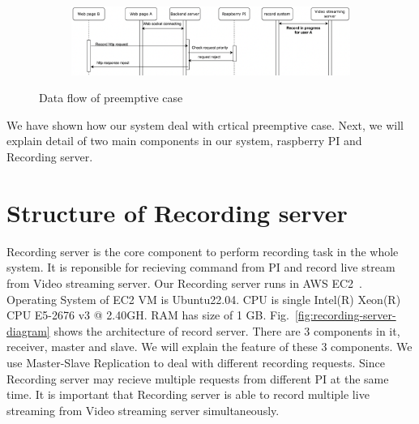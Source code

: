 \begin{figure}[H]
    \ContinuedFloat
    \centering
    \begin{subfigure}{\textwidth}
        \includegraphics[width=\textwidth]{figsrc/preemptive-B-lower.png}
        \label{fig:preemptive-B-lower}
    \end{subfigure}

    \caption{Data flow of preemptive case}
    \label{fig:preemptive-sequence}
\end{figure}

We have shown how our system deal with crtical preemptive case. Next, we will explain detail of two main components in our system, raspberry PI and Recording server. 

\section{Structure of Recording server}
Recording server is the core component to perform recording task in the whole system. It is reponsible for recieving command from PI and record live stream from Video streaming server. Our Recording server runs in AWS EC2~\cite{aws-ec2}. Operating System of EC2 VM is Ubuntu22.04. CPU is single Intel(R) Xeon(R) CPU E5-2676 v3 @ 2.40GH. RAM has size of 1 GB. Fig.~\ref{fig:recording-server-diagram} shows the architecture of record server. There are 3 components in it, receiver, master and slave. We will explain the feature of these 3 components. We use Master-Slave Replication to deal with different recording requests. Since Recording server may recieve multiple requests from different PI at the same time. It is important that Recording server is able to record multiple live streaming from Video streaming server simultaneously. 

